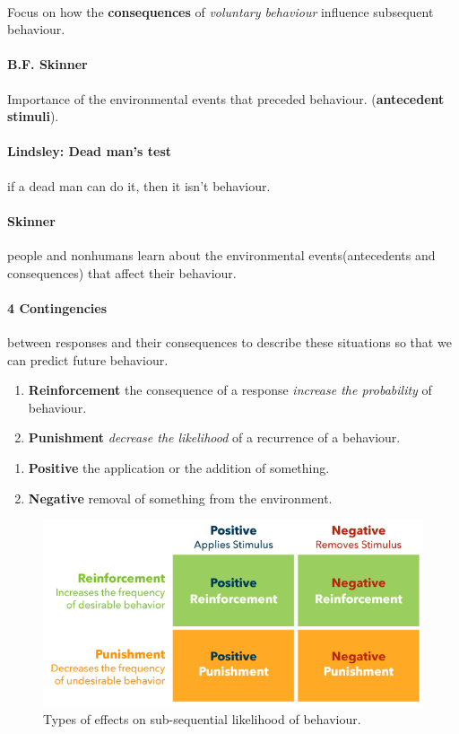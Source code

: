 \documentclass{article}
\begin{document}
	\paragraph{} Focus on how the \textbf{consequences} of \emph{voluntary behaviour} influence subsequent behaviour.
	\paragraph{B.F. Skinner} Importance of the environmental events that preceded behaviour. (\textbf{antecedent stimuli}).
	\paragraph{Lindsley: Dead man's test} if a dead man can do it, then it isn't behaviour.
	\paragraph{Skinner} people and nonhumans learn about the environmental events(antecedents and consequences) that affect their behaviour.
	\paragraph{4 Contingencies} between responses and their consequences to describe these situations so that we can predict future behaviour.
	\begin{enumerate}
		\item \textbf{Reinforcement} the consequence of a response \emph{increase the probability} of behaviour.
		\item \textbf{Punishment} \emph{decrease the likelihood} of a recurrence of a behaviour.
	\end{enumerate}
	\begin{enumerate}
		\item \textbf{Positive} the application or the addition of something.
		\item \textbf{Negative} removal of something from the environment.
	\end{enumerate}
	\begin{figure}
		\centering
		\includegraphics[width = \linewidth]{pic/reinforcing_types}
		\caption{Types of effects on sub-sequential likelihood of behaviour.}
	\end{figure}
\end{document}
